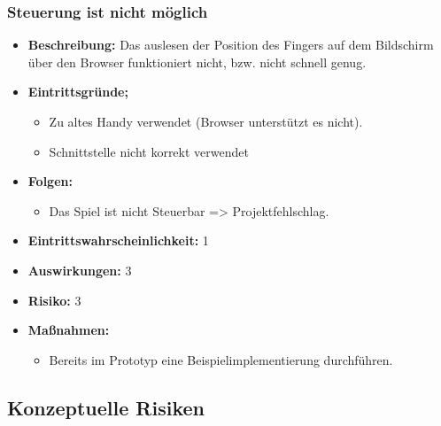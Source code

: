 \subsubsection{Steuerung ist nicht möglich}
\begin{itemize}
	\item \textbf{Beschreibung:} \newline
	Das auslesen der Position des Fingers auf dem Bildschirm über den Browser funktioniert nicht, bzw. nicht schnell genug.
	\item \textbf{Eintrittsgründe;}
	\begin{itemize}
		\item Zu altes Handy verwendet (Browser unterstützt es nicht).
		\item Schnittstelle nicht korrekt verwendet
	\end{itemize}
	\item \textbf{Folgen:}
	\begin{itemize}
		\item Das Spiel ist nicht Steuerbar => Projektfehlschlag.
	\end{itemize}
	\item \textbf{Eintrittswahrscheinlichkeit:} 1
	\item \textbf{Auswirkungen:} 3
	\item \textbf{Risiko:} 3
	\item \textbf{Maßnahmen:}
	\begin{itemize}
		\item Bereits im Prototyp eine Beispielimplementierung durchführen.
	\end{itemize}
\end{itemize}
\subsection{Konzeptuelle Risiken}
